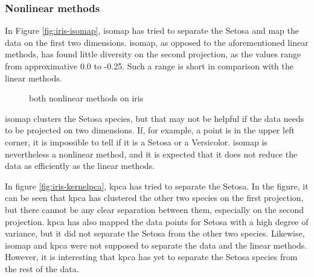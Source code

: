 \subsubsection{Nonlinear methods}\label{subsubsec:nonlinear-methods-on-iris}
In Figure \ref{fig:iris-isomap}, \gls{isomap} has tried to separate the Setosa and map the data on the first two dimensions. \gls{isomap}, as opposed to the aforementioned linear methods, has found little diversity on the second projection, as the values range from approximative 0.0 to -0.25. Such a range is short in comparison with the linear methods.


\begin{figure}[htb!]
    \centering
    \qquad
    \caption{both nonlinear methods on iris}
    \label{fig:nonlinear-methods-iris}
\end{figure}


\gls{isomap} clusters the Setosa species, but that may not be helpful if the data needs to be projected on two dimensions. If, for example, a point is in the upper left corner, it is impossible to tell if it is a Setosa or a Versicolor. \gls{isomap} is nevertheless a nonlinear method, and it is expected that it does not reduce the data as efficiently as the linear methods.

In figure \ref{fig:iris-kernelpca}, \gls{kpca} has tried to separate the Setosa. In the figure, it can be seen that \gls{kpca} has clustered the other two species on the first projection, but there cannot be any clear separation between them, especially on the second projection. \gls{kpca} has also mapped the data points for Setosa with a high degree of variance, but it did not separate the Setosa from the other two species. Likewise, \gls{isomap} and \gls{kpca} were not supposed to separate the data and the linear methods. However, it is interesting that \gls{kpca} has yet to separate the Setosa species from the rest of the data.


